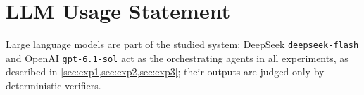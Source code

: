 \section*{LLM Usage Statement}
Large language models are part of the studied system: DeepSeek \texttt{deepseek-flash} and OpenAI
\texttt{gpt-6.1-sol} act as the orchestrating agents in all experiments, as described in
\cref{sec:exp1,sec:exp2,sec:exp3}; their outputs are judged only by deterministic verifiers.
